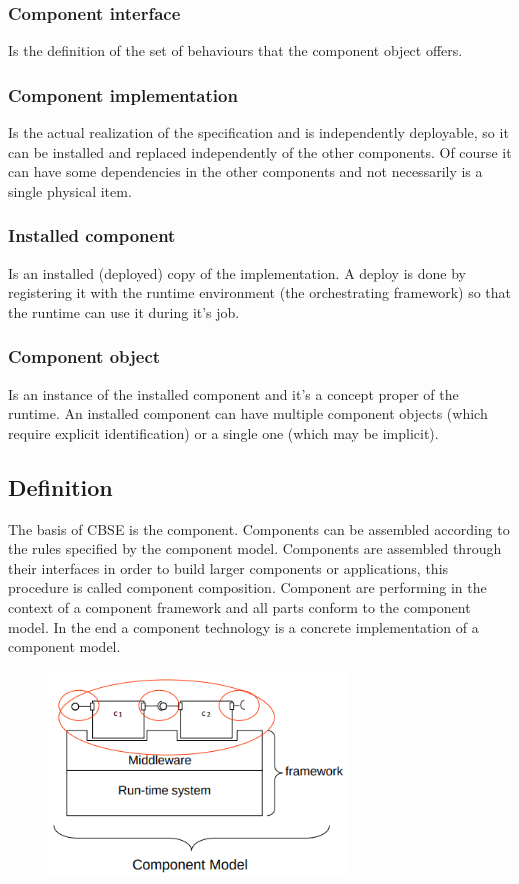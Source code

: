 \subsubsection{Component interface}
Is the definition of the set of behaviours that the component object offers.

\subsubsection{Component implementation}
Is the actual realization of the specification and is independently deployable, so it can be installed and replaced independently of the other components.
Of course it can have some dependencies in the other components and not necessarily is a single physical item.

\subsubsection{Installed component}
Is an installed (deployed) copy of the implementation.
A deploy is done by registering it with the runtime environment (the orchestrating framework) so that the runtime can use it during it's job.

\subsubsection{Component object}
Is an instance of the installed component and it's a concept proper of the runtime.
An installed component can have multiple component objects (which require explicit identification) or a single one (which may be implicit).

\subsection{Definition}
The basis of CBSE is the component.
Components can be assembled according to the rules specified by the component model.
Components are assembled through their interfaces in order to build larger components or applications, this procedure is called component composition.
Component are performing in the context of a component framework and all parts conform to the component model.
In the end a component technology is a concrete implementation of a component model.

\begin{figure}[H]
    \centering
    \includegraphics[width=300px]{images/3_Software_Components/component_model.png}
\end{figure}

